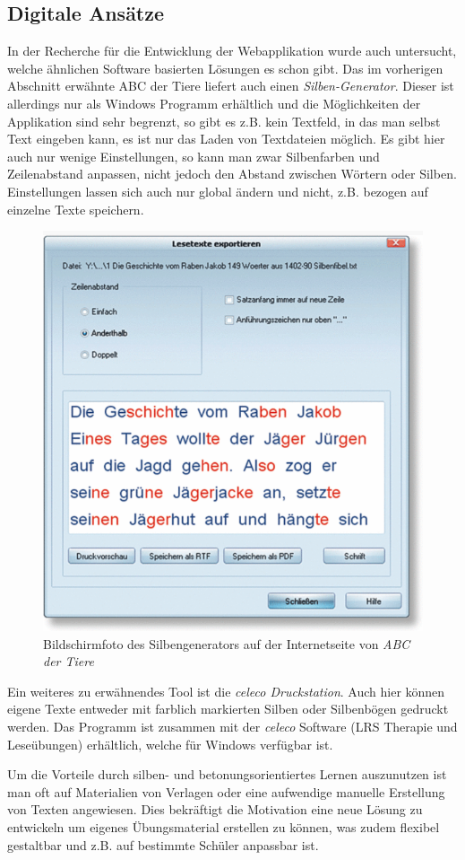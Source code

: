 \subsection{Digitale Ansätze}
\label{sec:lrs-digital}

In der Recherche für die Entwicklung der Webapplikation wurde auch untersucht, welche ähnlichen Software basierten Lösungen es schon gibt. Das im vorherigen Abschnitt erwähnte ABC der Tiere liefert auch einen \textit{Silben-Generator}\cite{ABCSilbengenerator2018}. Dieser ist allerdings nur als Windows Programm erhältlich und die Möglichkeiten der Applikation sind sehr begrenzt, so gibt es z.B. kein Textfeld, in das man selbst Text eingeben kann, es ist nur das Laden von Textdateien möglich. Es gibt hier auch nur wenige Einstellungen, so kann man zwar Silbenfarben und Zeilenabstand anpassen, nicht jedoch den Abstand zwischen Wörtern oder Silben. Einstellungen lassen sich auch nur global ändern und nicht, z.B. bezogen auf einzelne Texte speichern.\\

\begin{figure}[h!]
	\centering
	\includegraphics[width=.5\linewidth]{figures/ABCsilbengenerator}
	\caption{Bildschirmfoto des Silbengenerators auf der Internetseite von \textit{ABC der Tiere}\cite{ABCSilbengenerator2018}}
	\label{fig:ABCsilbengenerator}
\end{figure}

Ein weiteres zu erwähnendes Tool ist die \textit{celeco Druckstation}\cite{celeco2018}. Auch hier können eigene Texte entweder mit farblich markierten Silben oder Silbenbögen gedruckt werden. Das Programm ist zusammen mit der \textit{celeco} Software (LRS Therapie und Leseübungen) erhältlich, welche für Windows verfügbar ist.

Um die Vorteile durch silben- und betonungsorientiertes Lernen auszunutzen ist man oft auf Materialien von Verlagen oder eine aufwendige manuelle Erstellung von Texten angewiesen. Dies bekräftigt die Motivation eine neue Lösung zu entwickeln um eigenes Übungsmaterial erstellen zu können, was zudem flexibel gestaltbar und z.B. auf bestimmte Schüler anpassbar ist. 

